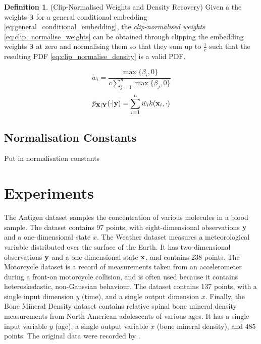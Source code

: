 \documentclass[twoside]{article} \usepackage{aistats2017}
\theoremstyle{definition}
\newtheorem{definition}{Definition}[section]
\theoremstyle{theorem}
\newcommand{\warn}[1]{{\color{red} #1}}
\begin{document}
		\begin{definition} \label{def:clip_normalise}
		(Clip-Normalised Weights and Density Recovery)
		Given a the weights $\bm{\beta}$ for a general conditional embedding \eqref{eq:general_conditional_embedding}, the \textit{clip-normalised weights} \eqref{eq:clip_normalise_weights} can be obtained through clipping the embedding weights $\bm{\beta}$ at zero and normalising them so that they sum up to $\frac{1}{c}$ such that the resulting PDF \eqref{eq:clip_normalise_density} is a valid PDF.

			\begin{equation}
				\tilde{w}_{i} = \frac{\max\{\beta_{i}, 0\}}{c \sum_{j = 1}^{n} \max\{\beta_{j}, 0\}}
			\label{eq:clip_normalise_weights}
			\end{equation}
			\begin{equation}
				\hat{p}_{\mathbf{X} | \mathbf{Y}}(\cdot | \mathbf{y}) = \sum_{i = 1}^{n} \tilde{w}_{i} k(\mathbf{x}_{i}, \cdot)
			\label{eq:clip_normalise_density}
			\end{equation}
		\end{definition}
	
	\subsection{Normalisation Constants}
	
		\warn{Put in normalisation constants}
			
\section{Experiments}
\label{sec:experiments}

	The Antigen dataset samples the concentration of various molecules \citep{quadrianto2009kernel} in a blood sample. The dataset contains 97 points, with eight-dimensional observations $\mathbf{y}$ and a one-dimensional state $x$. The Weather dataset measures a meteorological variable distributed over the surface of the Earth. It has two-dimensional observations $\mathbf{y}$ and a one-dimensional state $\mathbf{x}$, and contains 238 points. The Motorcycle dataset is a record of measurements taken from an accelerometer during a front-on motorcycle collision, and is often used because it contains heteroskedastic, non-Gaussian behaviour. The dataset contains 137 points, with a single input dimension $y$ (time), and a single output dimension $x$. Finally, the Bone Mineral Density dataset contains relative spinal bone mineral density measurements from North American adolescents of various ages. It has a single input variable $y$ (age), a single output variable $x$ (bone mineral density), and 485 points. The original data were recorded by \cite{bachrach1999bone}.
\end{document}
